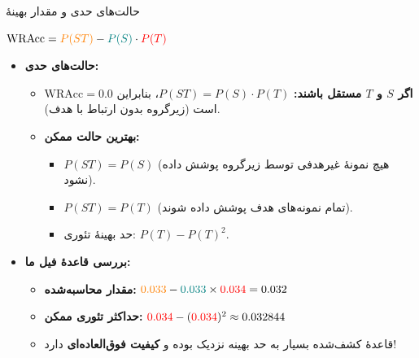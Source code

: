 \begin{frame}{حالت‌های حدی و مقدار بهینهٔ }{}
\begin{flushleft}
\begin{latin}
\normalsize\bfseries
$\mathrm{WRAcc} = {\color{orange}P(ST)} - {\color{teal}P(S)} \cdot {\color{red}P(T)}$
\end{latin}
\end{flushleft}

\begin{itemize}\setlength{\itemsep}{3pt}\small
    \item \textbf{حالت‌های حدی:}
    \begin{itemize}\footnotesize\setlength{\itemsep}{2pt}
        \item \textbf{اگر $S$ و $T$ مستقل باشند:} $P(ST) = P(S) \cdot P(T)$، بنابراین $\mathrm{WRAcc} = 0.0$ است (زیرگروه بدون ارتباط با هدف).
        \item \textbf{بهترین حالت ممکن:}
        \begin{itemize}\footnotesize
            \item $P(ST) = P(S)$ (هیچ نمونهٔ غیرهدفی توسط زیرگروه پوشش داده نشود).
            \item $P(ST) = P(T)$ (تمام نمونه‌های هدف پوشش داده شوند).
            \item حد بهینهٔ تئوری: $P(T) - P(T)^2$.
        \end{itemize}
    \end{itemize}
    \vspace{0.1cm}
    \item \textbf{بررسی قاعدهٔ فیل ما:}
    \begin{itemize}\footnotesize\setlength{\itemsep}{2pt}
        \item \textbf{مقدار محاسبه‌شده:} ${\color{orange}0.033} - {\color{teal}0.033} \times {\color{red}0.034} = 0.032$
        \item \textbf{حداکثر تئوری ممکن:} ${\color{red}0.034} - ({\color{red}0.034})^2 \approx 0.032844$
        \item قاعدهٔ کشف‌شده بسیار به حد بهینه نزدیک بوده و \textbf{کیفیت فوق‌العاده‌ای} دارد!
    \end{itemize}
\end{itemize}
\end{frame}
